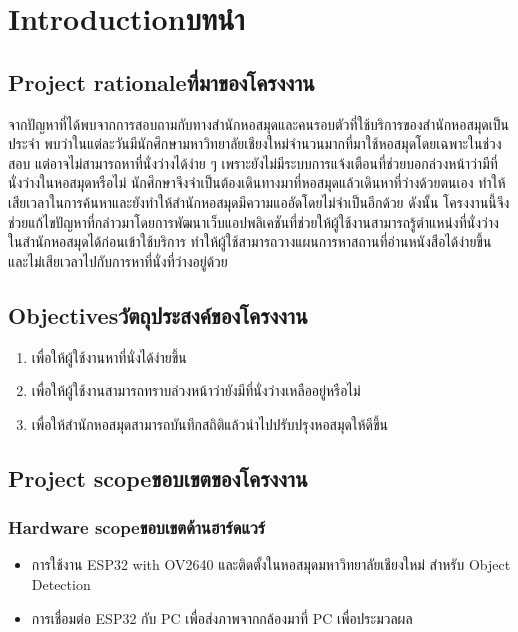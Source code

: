 \chapter{\ifenglish Introduction\else บทนำ\fi}

\section{\ifenglish Project rationale\else ที่มาของโครงงาน\fi}
จากปัญหาที่ได้พบจากการสอบถามกับทางสำนักหอสมุดและคนรอบตัวที่ใช้บริการของสำนักหอสมุดเป็นประจำ พบว่าในแต่ละวันมีนักศึกษามหาวิทยาลัยเชียงใหม่จำนวนมากที่มาใช้หอสมุดโดยเฉพาะในช่วงสอบ แต่อาจไม่สามารถหาที่นั่งว่างได้ง่าย ๆ 
เพราะยังไม่มีระบบการแจ้งเตือนที่ช่วยบอกล่วงหน้าว่ามีที่นั่งว่างในหอสมุดหรือไม่ นักศึกษาจึงจำเป็นต้องเดินทางมาที่หอสมุดแล้วเดินหาที่ว่างด้วยตนเอง ทำให้เสียเวลาในการค้นหาและยังทำให้สำนักหอสมุดมีความแออัดโดยไม่จำเป็นอีกด้วย
ดังนั้น โครงงานนี้จึงช่วยแก้ไขปัญหาที่กล่าวมาโดยการพัฒนาเว็บแอปพลิเคชันที่ช่วยให้ผู้ใช้งานสามารถรู้ตำแหน่งที่นั่งว่างในสำนักหอสมุดได้ก่อนเข้าใช้บริการ ทำให้ผู้ใช้สามารถวางแผนการหาสถานที่อ่านหนังสือได้ง่ายขึ้น 
และไม่เสียเวลาไปกับการหาที่นั่งที่ว่างอยู่ด้วย
\section{\ifenglish Objectives\else วัตถุประสงค์ของโครงงาน\fi}
\begin{enumerate}
    \item เพื่อให้ผู้ใช้งานหาที่นั่งได้ง่ายขึ้น
    \item เพื่อให้ผู้ใช้งานสามารถทราบล่วงหน้าว่ายังมีที่นั่งว่างเหลืออยู่หรือไม่ 
    \item เพื่อให้สำนักหอสมุดสามารถบันทึกสถิติแล้วนำไปปรับปรุงหอสมุดให้ดีขึ้น
\end{enumerate}

\section{\ifenglish Project scope\else ขอบเขตของโครงงาน\fi}

\subsection{\ifenglish Hardware scope\else ขอบเขตด้านฮาร์ดแวร์\fi}
\begin{itemize}
    \item การใช้งาน ESP32 with OV2640 และติดตั้งในหอสมุดมหาวิทยาลัยเชียงใหม่ สำหรับ Object Detection
    \item การเชื่อมต่อ ESP32 กับ PC เพื่อส่งภาพจากกล้องมาที่ PC เพื่อประมวลผล
\end{itemize}
